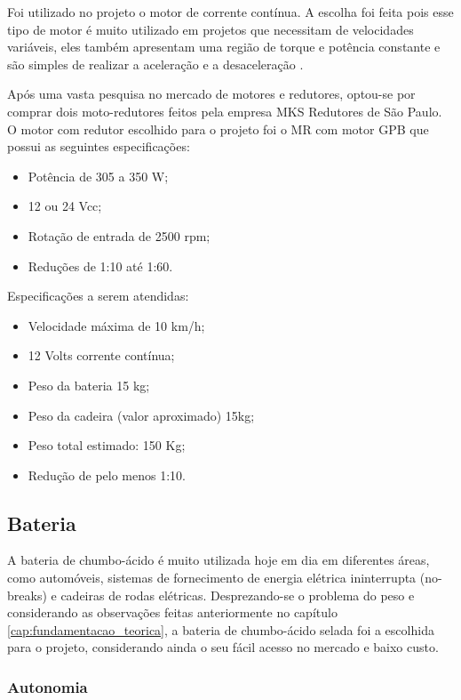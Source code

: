 	Foi utilizado no projeto o motor de corrente contínua. A escolha foi feita pois esse tipo de motor é muito utilizado em projetos que necessitam de velocidades variáveis, eles também apresentam uma região de torque e potência constante e são simples de realizar a aceleração e a desaceleração \cite{manual_bateria_unipower}.

	Após uma vasta pesquisa no mercado de motores e redutores, optou-se por comprar dois moto-redutores feitos pela empresa MKS Redutores de São Paulo. O motor com redutor escolhido para o projeto foi o MR com motor GPB que possui as seguintes especificações:

	\begin{itemize}
		\item Potência de 305 a 350 W;
		\item 12 ou 24 Vcc;
		\item Rotação de entrada de 2500 rpm;
		\item Reduções de 1:10 até 1:60.
	\end{itemize}

	Especificações a serem atendidas:

	\begin{itemize}
		\item Velocidade máxima de 10 km/h;
		\item 12 Volts corrente contínua;
		\item Peso da bateria 15 kg;
		\item Peso da cadeira (valor aproximado) 15kg;
		\item Peso total estimado: 150 Kg;
		\item Redução de pelo menos 1:10.
	\end{itemize}

	\subsection{Bateria}

	A bateria de chumbo-ácido é muito utilizada hoje em dia em diferentes áreas, como automóveis, sistemas de fornecimento de energia elétrica ininterrupta (no-breaks) e cadeiras de rodas elétricas. Desprezando-se o problema do peso e considerando as observações feitas anteriormente no capítulo \ref{cap:fundamentacao_teorica}, a bateria de chumbo-ácido selada foi a escolhida para o projeto, considerando ainda o seu fácil acesso no mercado e baixo custo.

	\subsubsection{Autonomia}

